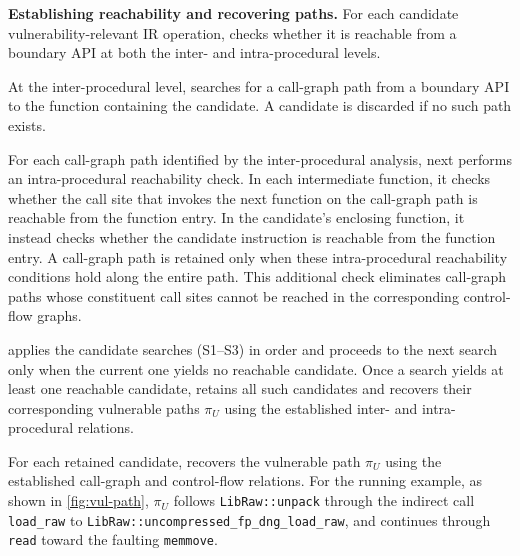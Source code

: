 \noindent\textbf{Establishing reachability and recovering paths.}
For each candidate vulnerability-relevant IR operation, \sys checks whether it is reachable from a boundary API at both the
inter- and intra-procedural levels.
%

At the inter-procedural level, \sys searches for a call-graph path from a boundary API to the function containing the candidate. A candidate is discarded if no such path exists.

For each call-graph path identified by the inter-procedural analysis, \sys next performs an intra-procedural reachability check. In each intermediate function, it checks whether the call site that invokes the next function on the call-graph path is reachable from the function entry. In the candidate's enclosing function, it instead checks whether the candidate instruction is reachable from the function entry. A call-graph path is retained only when these intra-procedural reachability conditions hold along the entire path. This additional check eliminates call-graph paths whose constituent call sites cannot be reached in the corresponding control-flow graphs.

\sys applies the candidate searches (S1--S3) in order and proceeds to the next search only when the current one yields no reachable candidate. Once a search yields at least one reachable candidate, \sys retains all such candidates and recovers their corresponding vulnerable paths $\pi_U$ using the established inter- and intra-procedural relations.




For each retained candidate, \sys recovers the vulnerable path $\pi_U$ using the established call-graph and control-flow relations.
For the running example, as shown in \autoref{fig:vul-path}, $\pi_U$
follows \texttt{LibRaw::unpack} through the indirect call
\texttt{load\_raw} to
\texttt{LibRaw::uncompressed\_fp\_dng\_load\_raw}, and continues through \texttt{read} toward the faulting
\texttt{memmove}.





